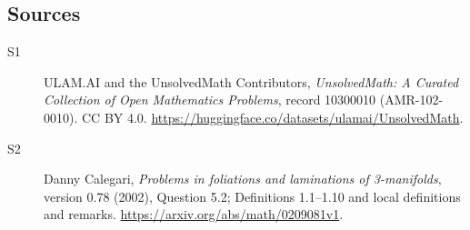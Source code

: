 \documentclass[11pt]{article}
\begin{document}
\subsection{Sources}
\begin{description}
\item[\hypertarget{source:10300010:1}{S1}] ULAM.AI and the UnsolvedMath Contributors, \emph{UnsolvedMath: A Curated Collection of Open Mathematics Problems}, record 10300010 (AMR-102-0010). CC BY 4.0. \url{https://huggingface.co/datasets/ulamai/UnsolvedMath}.
\item[\hypertarget{source:10300010:2}{S2}] Danny Calegari, \emph{Problems in foliations and laminations of 3-manifolds}, version 0.78 (2002), Question 5.2; Definitions 1.1--1.10 and local definitions and remarks. \url{https://arxiv.org/abs/math/0209081v1}.
\end{description}
\label{end:10300010}
\end{document}
